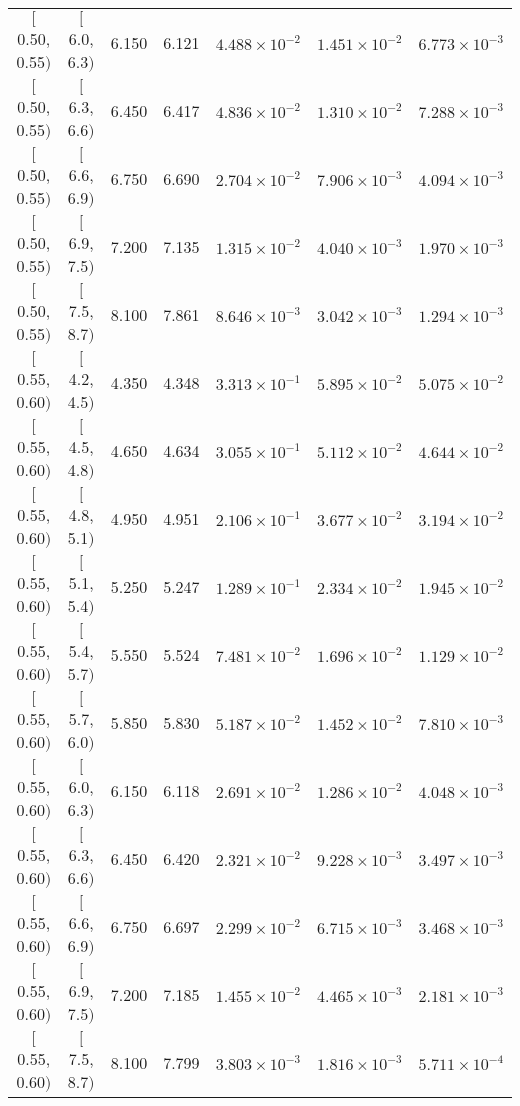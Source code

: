 \begin{longtable}{| c | c | c | c | c | c | c |}
$[$0.50, 0.55$)$ & $[$6.0, 6.3$)$ & 6.150 & 6.121 & $4.488 \times 10^{-2}$ & $1.451 \times 10^{-2}$ & $6.773 \times 10^{-3}$ \\
$[$0.50, 0.55$)$ & $[$6.3, 6.6$)$ & 6.450 & 6.417 & $4.836 \times 10^{-2}$ & $1.310 \times 10^{-2}$ & $7.288 \times 10^{-3}$ \\
$[$0.50, 0.55$)$ & $[$6.6, 6.9$)$ & 6.750 & 6.690 & $2.704 \times 10^{-2}$ & $7.906 \times 10^{-3}$ & $4.094 \times 10^{-3}$ \\
$[$0.50, 0.55$)$ & $[$6.9, 7.5$)$ & 7.200 & 7.135 & $1.315 \times 10^{-2}$ & $4.040 \times 10^{-3}$ & $1.970 \times 10^{-3}$ \\
$[$0.50, 0.55$)$ & $[$7.5, 8.7$)$ & 8.100 & 7.861 & $8.646 \times 10^{-3}$ & $3.042 \times 10^{-3}$ & $1.294 \times 10^{-3}$ \\
\hline
$[$0.55, 0.60$)$ & $[$4.2, 4.5$)$ & 4.350 & 4.348 & $3.313 \times 10^{-1}$ & $5.895 \times 10^{-2}$ & $5.075 \times 10^{-2}$ \\
$[$0.55, 0.60$)$ & $[$4.5, 4.8$)$ & 4.650 & 4.634 & $3.055 \times 10^{-1}$ & $5.112 \times 10^{-2}$ & $4.644 \times 10^{-2}$ \\
$[$0.55, 0.60$)$ & $[$4.8, 5.1$)$ & 4.950 & 4.951 & $2.106 \times 10^{-1}$ & $3.677 \times 10^{-2}$ & $3.194 \times 10^{-2}$ \\
$[$0.55, 0.60$)$ & $[$5.1, 5.4$)$ & 5.250 & 5.247 & $1.289 \times 10^{-1}$ & $2.334 \times 10^{-2}$ & $1.945 \times 10^{-2}$ \\
$[$0.55, 0.60$)$ & $[$5.4, 5.7$)$ & 5.550 & 5.524 & $7.481 \times 10^{-2}$ & $1.696 \times 10^{-2}$ & $1.129 \times 10^{-2}$ \\
$[$0.55, 0.60$)$ & $[$5.7, 6.0$)$ & 5.850 & 5.830 & $5.187 \times 10^{-2}$ & $1.452 \times 10^{-2}$ & $7.810 \times 10^{-3}$ \\
$[$0.55, 0.60$)$ & $[$6.0, 6.3$)$ & 6.150 & 6.118 & $2.691 \times 10^{-2}$ & $1.286 \times 10^{-2}$ & $4.048 \times 10^{-3}$ \\
$[$0.55, 0.60$)$ & $[$6.3, 6.6$)$ & 6.450 & 6.420 & $2.321 \times 10^{-2}$ & $9.228 \times 10^{-3}$ & $3.497 \times 10^{-3}$ \\
$[$0.55, 0.60$)$ & $[$6.6, 6.9$)$ & 6.750 & 6.697 & $2.299 \times 10^{-2}$ & $6.715 \times 10^{-3}$ & $3.468 \times 10^{-3}$ \\
$[$0.55, 0.60$)$ & $[$6.9, 7.5$)$ & 7.200 & 7.185 & $1.455 \times 10^{-2}$ & $4.465 \times 10^{-3}$ & $2.181 \times 10^{-3}$ \\
$[$0.55, 0.60$)$ & $[$7.5, 8.7$)$ & 8.100 & 7.799 & $3.803 \times 10^{-3}$ & $1.816 \times 10^{-3}$ & $5.711 \times 10^{-4}$ \\

\end{longtable}
